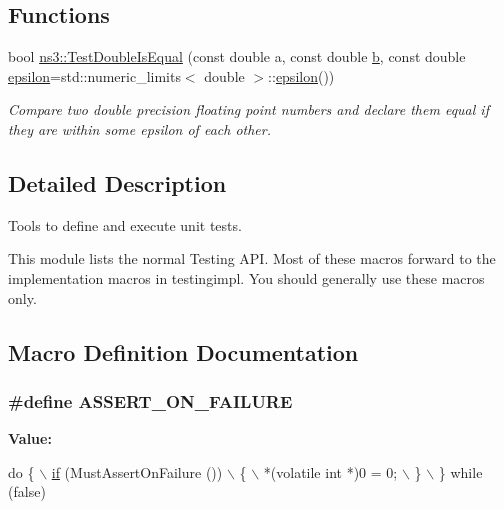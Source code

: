 \subsection*{Functions}
\begin{DoxyCompactItemize}
\item 
bool \hyperlink{group__testing_ga13a5d60f4d34641d7e2fd799f2c4d952}{ns3\+::\+Test\+Double\+Is\+Equal} (const double a, const double \hyperlink{lte__pathloss_8m_a21ad0bd836b90d08f4cf640b4c298e7c}{b}, const double \hyperlink{tv-spectrum-transmitter-test_8cc_a4904cc82627458fdf6672ccc0b2802c7}{epsilon}=std\+::numeric\+\_\+limits$<$ double $>$\+::\hyperlink{tv-spectrum-transmitter-test_8cc_a4904cc82627458fdf6672ccc0b2802c7}{epsilon}())
\begin{DoxyCompactList}\small\item\em Compare two double precision floating point numbers and declare them equal if they are within some epsilon of each other. \end{DoxyCompactList}\end{DoxyCompactItemize}


\subsection{Detailed Description}
Tools to define and execute unit tests. 

This module lists the normal Testing A\+PI. Most of these macros forward to the implementation macros in testingimpl. You should generally use these macros only. 

\subsection{Macro Definition Documentation}
\subsubsection[{\texorpdfstring{A\+S\+S\+E\+R\+T\+\_\+\+O\+N\+\_\+\+F\+A\+I\+L\+U\+RE}{ASSERT_ON_FAILURE}}]{\setlength{\rightskip}{0pt plus 5cm}\#define A\+S\+S\+E\+R\+T\+\_\+\+O\+N\+\_\+\+F\+A\+I\+L\+U\+RE}\hypertarget{group__testing_ga044d7c8c214fe3761af96ee3cbe2edc3}{}\label{group__testing_ga044d7c8c214fe3761af96ee3cbe2edc3}
{\bfseries Value\+:}
\begin{DoxyCode}
\textcolor{keywordflow}{do} \{                                          \hyperlink{loss__ITU1238_8m_a419d895abe1313c35fa353c93802647e}{\(\backslash\)}
\hyperlink{loss__ITU1238_8m_a419d895abe1313c35fa353c93802647e}{    if} (MustAssertOnFailure ())                 \(\backslash\)
      \{                                         \(\backslash\)
        *(\textcolor{keyword}{volatile} \textcolor{keywordtype}{int} *)0 = 0;                 \(\backslash\)
      \}                                         \(\backslash\)
  \} \textcolor{keywordflow}{while} (\textcolor{keyword}{false})
\end{DoxyCode}


